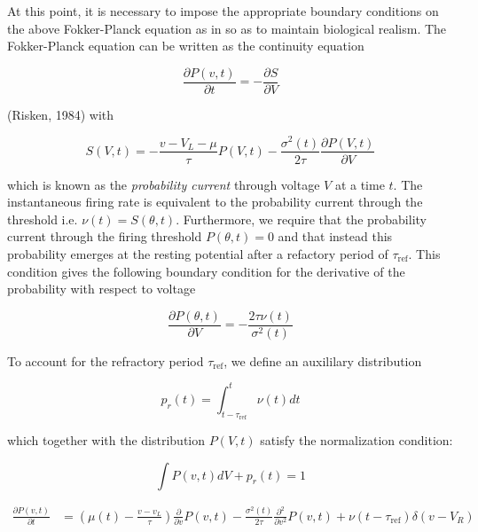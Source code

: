 \documentclass{ucetd}
\begin{document}
At this point, it is necessary to impose the appropriate boundary conditions on the above Fokker-Planck equation as in so as to maintain biological realism. The Fokker-Planck equation can be written as the continuity equation 

\begin{equation*}
\frac{\partial P(v,t)}{\partial t} = -\frac{\partial S}{\partial V}
\end{equation*}

(Risken, 1984) with 

\begin{equation*}
S(V,t) = -\frac{v-V_{L}-\mu}{\tau}P(V,t) - \frac{\sigma^{2}(t)}{2\tau}\frac{\partial P(V,t)}{\partial V}
\end{equation*}

which is known as the \emph{probability current} through voltage $V$ at a time $t$. The instantaneous firing rate is equivalent to the probability current through the threshold i.e. $\nu(t) = S(\theta,t)$. Furthermore, we require that the probability current through the firing threshold $P(\theta, t)=0$ and that instead this probability emerges at the resting potential after a refactory period of $\tau_{\mathrm{ref}}$. This condition gives the following boundary condition for the derivative of the probability with respect to voltage

\begin{equation*}
\frac{\partial P(\theta,t)}{\partial V} = -\frac{2\tau\nu(t)}{\sigma^{2}(t)}
\end{equation*}

To account for the refractory period $\tau_{\mathrm{ref}}$, we define an auxililary distribution

\begin{equation*}
p_{r}(t) = \int_{t-\tau_{\mathrm{ref}}}^{t} \nu(t)dt
\end{equation*}

which together with the distribution $P(V,t)$ satisfy the normalization condition:

\begin{equation*}
\int P(v,t)dV + p_{r}(t) = 1
\end{equation*}

\begin{align*}
\frac{\partial P(v,t)}{\partial t} &= \left(\mu(t) - \frac{v-v_{L}}{\tau}\right) \frac{\partial}{\partial v} P(v,t) - \frac{\sigma^{2}(t)}{2\tau}\frac{\partial^{2}}{\partial v^{2}} P(v,t) + \nu(t-\tau_{\mathrm{ref}})\delta(v-V_{R})\\
\end{align*} 
\end{document}
